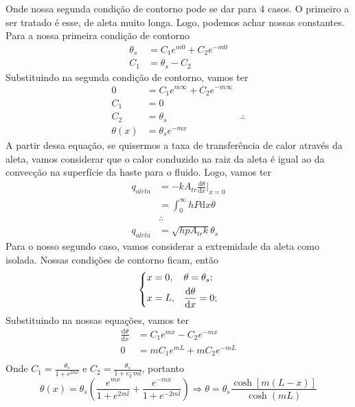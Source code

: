 Onde nossa segunda condição de contorno pode se dar para 4 casos. O primeiro a ser tratado é esse,
de aleta muito longa. Logo, podemos achar nossas constantes. Para a nossa primeira condição de contorno
\begin{align}
    \theta_s &= C_1 e^{m0}  + C_2 e^{-m0} \\
    C_1 &= \theta_s - C_2
\end{align}
Substituindo na segunda condição de contorno, vamos ter
\begin{align}
    0 &= C_1 e^{m\infty} + C_2 e^{-m\infty}\\
    C_1 &= 0\\
    C_2 &= \theta_s
    & \therefore\\
    \theta (x) &= \theta_s e^{-mx}  
\end{align}
A partir dessa equação, se quisermos a taxa de transferência de calor através da aleta, vamos
considerar que o calor conduzido na raiz da aleta é igual ao da convecção na superfície da haste
para o fluido. Logo, vamos ter
\begin{align}
    q_{aleta} &= - k A_{tr} \frac{\mathrm{d}\theta}{\mathrm{d}x}|_{x = 0}\\
    &= \int_{0}^{\infty} h P \mathrm{d}x \theta\\
    &\therefore\\
    q_{aleta} &= \sqrt{h p A_{tr} k} \theta_s
\end{align}
Para o nosso segundo caso, vamos considerar a extremidade da aleta como isolada. Nossas condições de
contorno ficam, então
\begin{align}
    \begin{dcases}
        x = 0 , & \theta = \theta_s ;\\
        x = L , & \frac{\mathrm{d}\theta}{\mathrm{d}x} = 0 ;\\
    \end{dcases}
\end{align}
Substituindo na nossas equações, vamos ter
\begin{align}
    \frac{\mathrm{d}\theta}{\mathrm{d}x} &= C_1 e^{mx} - C_2 e^{-mx}\\
    0 &= mC_1 e^{mL} + mC_2 e^{-mL}\\
\end{align}
Onde \(C_1 = \frac{\theta_s}{1 + e^{2ml}} \) e \(C_2 = \frac{\theta_s}{1 + e^{ -}_2ml}  \), portanto
\begin{equation}
    \theta (x) = \theta_s \left( \frac{e^{mx}}{1 + e^{2ml}} + \frac{e^{-mx}}{1 + e^{- 2ml} }\right) \Rightarrow \theta = \theta_s \frac{\cosh \left[m \left(L - x\right)\right]}{\cosh \left(mL\right)} 
\end{equation}
